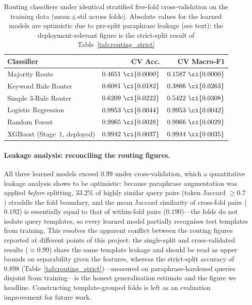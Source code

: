 \begin{table}[!htbp]
\centering
\caption{Routing classifiers under identical stratified five-fold
cross-validation on the training data (mean\,$\pm$\,std across folds).
Absolute values for the learned models are optimistic due to pre-split
paraphrase leakage (see text); the deployment-relevant figure is the
strict-split result of Table~\ref{tab:routing_strict}}\label{tab:routing_cv}
\begin{tabular}{lrr}
\toprule
\textbf{Classifier} & \textbf{CV Acc.} & \textbf{CV Macro-F1} \\
\midrule
Majority Route        & $0.4651\ \ci{0.0000}$ & $0.1587\ \ci{0.0000}$ \\
Keyword Rule Router   & $0.6081\ \ci{0.0182}$ & $0.3866\ \ci{0.0263}$ \\
Simple 3-Rule Router  & $0.6209\ \ci{0.0222}$ & $0.5422\ \ci{0.0308}$ \\
Logistic Regression   & $0.9953\ \ci{0.0044}$ & $0.9953\ \ci{0.0042}$ \\
Random Forest         & $0.9965\ \ci{0.0028}$ & $0.9966\ \ci{0.0029}$ \\
XGBoost (Stage~1, deployed) & $0.9942\ \ci{0.0037}$ & $0.9944\ \ci{0.0035}$ \\
\bottomrule
\end{tabular}
\end{table}

\paragraph{Leakage analysis: reconciling the routing figures.}
All three learned models exceed $0.99$ under cross-validation, which a
quantitative leakage analysis shows to be optimistic: because paraphrase
augmentation was applied \emph{before} splitting, $33.2\%$ of highly similar
query pairs (token Jaccard $\ge 0.7$) straddle the fold boundary, and the
mean Jaccard similarity of cross-fold pairs ($0.192$) is essentially equal to
that of within-fold pairs ($0.190$)---the folds do not isolate query
templates, so every learned model partially recognises test templates from
training. This resolves the apparent conflict between the routing figures
reported at different points of this project: the single-split and
cross-validated results ($\approx 0.99$) share the same template leakage and
should be read as upper bounds on separability given the features, whereas
the strict-split accuracy of $0.898$
(Table~\ref{tab:routing_strict})---measured on paraphrase-hardened queries
disjoint from training---is the honest generalisation estimate and the figure
we headline. Constructing template-grouped folds is left as an evaluation
improvement for future work.

